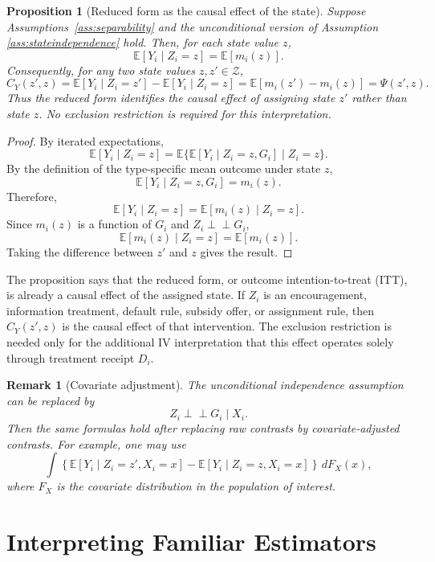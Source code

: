 \documentclass[11pt]{article}
\newtheorem{proposition}{Proposition}
\newtheorem{remark}{Remark}
\newcommand{\E}{\mathbb{E}}
\newcommand{\1}{\mathbf{1}}
\newcommand{\Perp}{\perp \!\!\! \perp}
\begin{document}
\begin{proposition}[Reduced form as the causal effect of the state]
\label{prop:state_itt}
Suppose Assumptions~\ref{ass:separability} and the unconditional version of Assumption \ref{ass:stateindependence} hold.
Then, for each state value \(z\),
\[
        \E[Y_i\mid Z_i=z]=\E[m_i(z)].
\]
Consequently, for any two state values \(z,z'\in\mathcal Z\),
\[
        C_Y(z',z)
        =
        \E[Y_i\mid Z_i=z']-\E[Y_i\mid Z_i=z]
        =
        \E[m_i(z')-m_i(z)]
        =
        \Psi(z',z).
\]
Thus the reduced form identifies the causal effect of assigning state \(z'\)
rather than state \(z\). No exclusion restriction is required for this
interpretation.
\end{proposition}

\begin{proof}
By iterated expectations,
\[
\E[Y_i\mid Z_i=z]
=
\E\{\E[Y_i\mid Z_i=z,G_i]\mid Z_i=z\}.
\]
By the definition of the type-specific mean outcome under state \(z\),
\[
\E[Y_i\mid Z_i=z,G_i]=m_i(z).
\]
Therefore,
\[
\E[Y_i\mid Z_i=z]
=
\E[m_i(z)\mid Z_i=z].
\]
Since \(m_i(z)\) is a function of \(G_i\) and \(Z_i\Perp G_i\),
\[
\E[m_i(z)\mid Z_i=z]=\E[m_i(z)].
\]
Taking the difference between \(z'\) and \(z\) gives the result.
\end{proof}
The proposition says that the reduced form, or outcome intention-to-treat (ITT), is already a causal
effect of the assigned state. If \(Z_i\) is an encouragement, information
treatment, default rule, subsidy offer, or assignment rule, then
\(C_Y(z',z)\) is the causal effect of that intervention. The exclusion
restriction is needed only for the additional IV interpretation that this
effect operates solely through treatment receipt \(D_i\).




\begin{remark}[Covariate adjustment]
The unconditional independence assumption can be replaced by
\[
Z_i\Perp G_i\mid X_i.
\]
Then the same formulas hold after replacing raw contrasts by covariate-adjusted
contrasts. For example, one may use
\[
\int
\left\{
\E[Y_i\mid Z_i=z',X_i=x]
-
\E[Y_i\mid Z_i=z,X_i=x]
\right\}
\,dF_X(x),
\]
where \(F_X\) is the covariate distribution in the population of interest.
\end{remark}




\section{Interpreting Familiar Estimators}
\label{sec:familiar}
\end{document}
